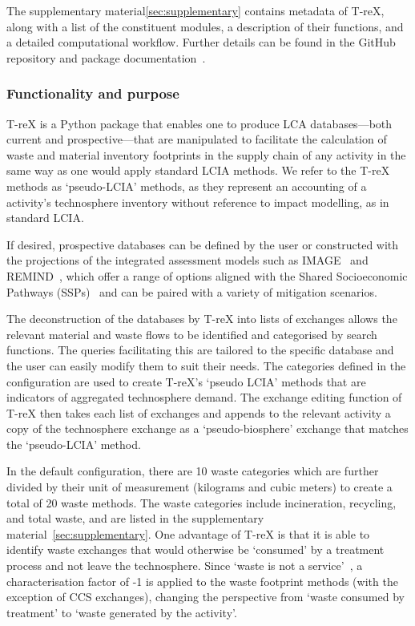 The supplementary material\autoref{sec:supplementary} contains metadata of T-reX, along with a list of the constituent modules, a description of their functions, and a detailed computational workflow. Further details can be found in the GitHub repository and package documentation~\citep{mcdowall2024T-reXgithub, mcdowall2023T-reXdocs}.

\subsubsection{Functionality and purpose}

T-reX is a Python package that enables one to produce LCA databases---both current and prospective---that are manipulated to facilitate the calculation of waste and material inventory footprints in the supply chain of any activity in the same way as one would apply standard LCIA methods. We refer to the T-reX methods as `pseudo-LCIA' methods, as they represent an accounting of a activity's technosphere inventory without reference to impact modelling, as in standard LCIA.

If desired, prospective databases can be defined by the user or constructed with the projections of the integrated assessment models such as IMAGE~\citep{stehfest2014image} and REMIND~\citep{remind2020model}, which offer a range of options aligned with the Shared Socioeconomic Pathways (SSPs)~\citep{ssp2020ghg} and can be paired with a variety of mitigation scenarios.

The deconstruction of the databases by T-reX into lists of exchanges allows the relevant material and waste flows to be identified and categorised by search functions. The queries facilitating this are tailored to the specific database and the user can easily modify them to suit their needs. The categories defined in the configuration are used to create T-reX's `pseudo LCIA' methods that are indicators of aggregated technosphere demand. The exchange editing function of T-reX then takes each list of exchanges and appends to the relevant activity a copy of the technosphere exchange as a `pseudo-biosphere' exchange that matches the `pseudo-LCIA' method.

In the default configuration, there are 10 waste categories which are further divided by their unit of measurement (kilograms and cubic meters) to create a total of 20 waste methods. The waste categories include incineration, recycling, and total waste, and are listed in the supplementary material~\autoref{sec:supplementary}. One advantage of T-reX is that it is able to identify waste exchanges that would otherwise be `consumed' by a treatment process and not leave the technosphere. Since `waste is not a service'~\citep{guinee2021wasteisnotaservice}, a characterisation factor of -1 is applied to the waste footprint methods (with the exception of CCS exchanges), changing the perspective from `waste consumed by treatment' to `waste generated by the activity'.

